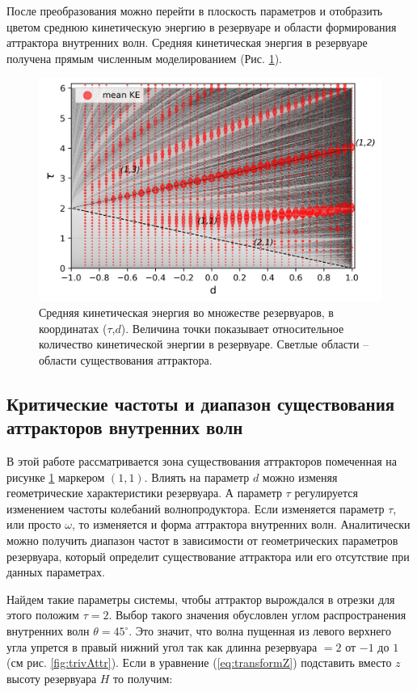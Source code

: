 После преобразования можно перейти в плоскость параметров и отобразить цветом среднюю кинетическую энергию в резервуаре \cite{Maas1997} и области формирования аттрактора внутренних волн. Средняя кинетическая энергия в резервуаре получена прямым численным моделированием (Рис. \ref{fig:diagramm}). 

\begin{figure}
    \centering
    \includegraphics{pics/KEandLyap.png}
    \caption{Средняя кинетическая энергия во множестве резервуаров, в координатах ($\tau$,$d$). Величина точки показывает относительное количество кинетической энергии в резервуаре. Светлые области -- области существования аттрактора. }
    \label{fig:diagramm}
\end{figure}

\subsection{Критические частоты и диапазон существования аттракторов внутренних волн}

В этой работе рассматривается зона существования аттракторов помеченная на рисунке \ref{fig:diagramm} маркером $(1,1)$. Влиять на параметр $d$ можно изменяя геометрические характеристики резервуара. А параметр $\tau$ регулируется изменением частоты колебаний волнопродуктора. Если изменяется параметр $\tau$, или просто $\omega$, то изменяется и форма аттрактора внутренних волн. Аналитически можно получить диапазон частот в зависимости от геометрических параметров резервуара, который определит существование аттрактора или его отсутствие при данных параметрах.

Найдем такие параметры системы, чтобы аттрактор вырождался в отрезки для этого положим $\tau=2$. Выбор такого значения обусловлен углом распространения внутренних волн $\theta = 45^{\circ}$. Это значит, что волна пущенная из левого верхнего угла упрется в правый нижний угол так как длинна резервуара $=2$ от $-1$ до $1$(см рис. \ref{fig:trivAttr}). Если в уравнение (\ref{eq:transformZ}) подставить вместо $z$ высоту резервуара $H$ то получим:

